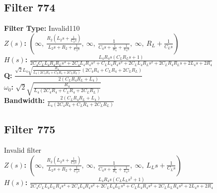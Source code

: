 \documentclass{article}
\begin{document}
\subsection*{Filter 774}
\textbf{Filter Type:} Invalid110 \\ 
\textbf{$Z(s)$:} $\left( \infty, \  \frac{R_{2} \left(L_{2} s + \frac{1}{C_{2} s}\right)}{L_{2} s + R_{2} + \frac{1}{C_{2} s}}, \  \infty, \  \frac{1}{C_{4} s + \frac{1}{R_{4}} + \frac{1}{L_{4} s}}, \  \infty, \  R_{L} + \frac{1}{C_{L} s}\right)$ \\ 
\textbf{$H(s)$:} $\frac{L_{4} R_{4} s \left(C_{L} R_{L} s + 1\right)}{2 C_{4} C_{L} L_{4} R_{4} R_{L} s^{3} + 2 C_{4} L_{4} R_{4} s^{2} + C_{L} L_{4} R_{4} s^{2} + 2 C_{L} L_{4} R_{L} s^{2} + 2 C_{L} R_{4} R_{L} s + 2 L_{4} s + 2 R_{4}}$ \\ 
\textbf{Q:} $\frac{\sqrt{2} L_{4} \sqrt{\frac{R_{4}}{L_{4} \left(2 C_{4} R_{4} + C_{L} R_{4} + 2 C_{L} R_{L}\right)}} \left(2 C_{4} R_{4} + C_{L} R_{4} + 2 C_{L} R_{L}\right)}{2 \left(C_{L} R_{4} R_{L} + L_{4}\right)}$ \\ 
\textbf{$\omega_0$:} $\sqrt{2} \sqrt{\frac{R_{4}}{L_{4} \left(2 C_{4} R_{4} + C_{L} R_{4} + 2 C_{L} R_{L}\right)}}$ \\ 
\textbf{Bandwidth:} $\frac{2 \left(C_{L} R_{4} R_{L} + L_{4}\right)}{L_{4} \left(2 C_{4} R_{4} + C_{L} R_{4} + 2 C_{L} R_{L}\right)}$ \\ 
\subsection*{Filter 775}
Invalid filter \\ 
\textbf{$Z(s)$:} $\left( \infty, \  \frac{R_{2} \left(L_{2} s + \frac{1}{C_{2} s}\right)}{L_{2} s + R_{2} + \frac{1}{C_{2} s}}, \  \infty, \  \frac{1}{C_{4} s + \frac{1}{R_{4}} + \frac{1}{L_{4} s}}, \  \infty, \  L_{L} s + \frac{1}{C_{L} s}\right)$ \\ 
\textbf{$H(s)$:} $\frac{L_{4} R_{4} s \left(C_{L} L_{L} s^{2} + 1\right)}{2 C_{4} C_{L} L_{4} L_{L} R_{4} s^{4} + 2 C_{4} L_{4} R_{4} s^{2} + 2 C_{L} L_{4} L_{L} s^{3} + C_{L} L_{4} R_{4} s^{2} + 2 C_{L} L_{L} R_{4} s^{2} + 2 L_{4} s + 2 R_{4}}$ \\ 
\end{document}
